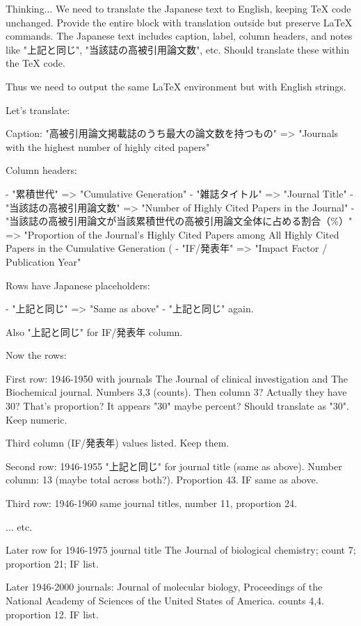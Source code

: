 Thinking...
We need to translate the Japanese text to English, keeping TeX code unchanged. Provide the entire block with translation outside but preserve LaTeX commands. The Japanese text includes caption, label, column headers, and notes like "上記と同じ", "当該誌の高被引用論文数", etc. Should translate these within the TeX code.

Thus we need to output the same LaTeX environment but with English strings.

Let's translate:

Caption: "高被引用論文掲載誌のうち最大の論文数を持つもの" => "Journals with the highest number of highly cited papers"

Column headers:

- "累積世代" => "Cumulative Generation"
- "雑誌タイトル" => "Journal Title"
- "当該誌の高被引用論文数" => "Number of Highly Cited Papers in the Journal"
- "当該誌の高被引用論文が当該累積世代の高被引用論文全体に占める割合（\%）" => "Proportion of the Journal's Highly Cited Papers among All Highly Cited Papers in the Cumulative Generation (%
- "IF/発表年" => "Impact Factor / Publication Year"

Rows have Japanese placeholders:

- "上記と同じ" => "Same as above"
- "上記と同じ" again.

Also "上記と同じ" for IF/発表年 column.

Now the rows:

First row: {1946-1950} with journals The Journal of clinical investigation and The Biochemical journal. Numbers 3,3 (counts). Then column 3? Actually they have 30? That's proportion? It appears "30" maybe percent? Should translate as "30". Keep numeric.

Third column (IF/発表年) values listed. Keep them.

Second row: {1946-1955} "上記と同じ" for journal title (same as above). Number column: 13 (maybe total across both?). Proportion 43. IF same as above.

Third row: {1946-1960} same journal titles, number 11, proportion 24.

... etc.

Later row for {1946-1975} journal title The Journal of biological chemistry; count 7; proportion 21; IF list.

Later {1946-2000} journals: Journal of molecular biology, Proceedings of the National Academy of Sciences of the United States of America. counts 4,4. proportion 12. IF list.

